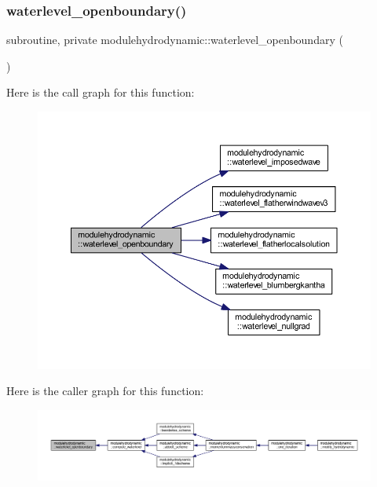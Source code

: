 \subsubsection{\texorpdfstring{waterlevel\+\_\+openboundary()}{waterlevel\_openboundary()}}
{\footnotesize\ttfamily subroutine, private modulehydrodynamic\+::waterlevel\+\_\+openboundary (\begin{DoxyParamCaption}{ }\end{DoxyParamCaption})\hspace{0.3cm}{\ttfamily [private]}}

Here is the call graph for this function\+:\nopagebreak
\begin{figure}[H]
\begin{center}
\leavevmode
\includegraphics[width=350pt]{namespacemodulehydrodynamic_abc3f56e92d973f39a2bde89ee0ee561f_cgraph}
\end{center}
\end{figure}
Here is the caller graph for this function\+:\nopagebreak
\begin{figure}[H]
\begin{center}
\leavevmode
\includegraphics[width=350pt]{namespacemodulehydrodynamic_abc3f56e92d973f39a2bde89ee0ee561f_icgraph}
\end{center}
\end{figure}
\mbox{\label{namespacemodulehydrodynamic_af4cd55d170e7b64149a737b5bbe9951c}} 
